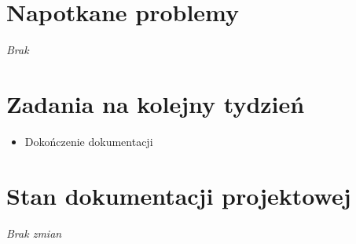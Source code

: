\documentclass[12pt,a4paper]{mwart}
\begin{document}
\section{Napotkane problemy}
\textit{Brak}

\section{Zadania na kolejny tydzień}
\begin{itemize}
	\item Dokończenie dokumentacji
\end{itemize}

\section{Stan dokumentacji projektowej}
\textit{Brak zmian}
\end{document}
